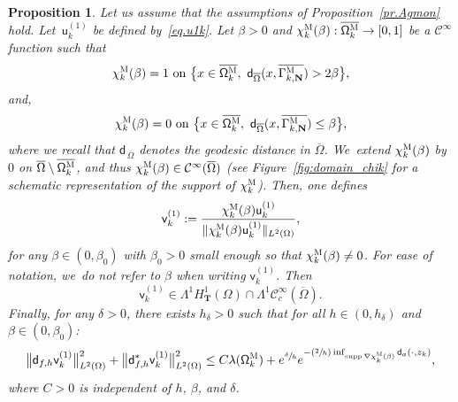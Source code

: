 \documentclass[JEP,XML,SOM,Unicode,NoEqCountersInSection,NoFloatCountersInSection,published]{cedram}
\newcommand{\Psfrac}[2]{(\sfrac{#1}{#2})}
\newcommand{\mbf}[1]{\mathbf{#1}}
\DeclareMathOperator\supp{supp}
\theoremstyle{plain}
\newtheorem{proposition}{Proposition}
\theoremstyle{definition}
\begin{document}
\begin{proposition}\label{pr.AgmonQM}
Let us assume that the assumptions of Proposition~\ref{pr.Agmon} hold.
Let~$\mathsf u^{(1)}_k$ be defined by~\eqref{eq.u1k}.
Let $\beta>0$ and $\chi_k^{\textsc{M}} (\beta): \overline{ \mathsf \Omega_k^{\textsc{M}}} \to [0,1]$ be a $\mathcal C^\infty$ function such that
\begin{equation}\label{eq.supp-close1}
\chi_k^{\textsc{M}} (\beta)=1 \text{ on } \big \{x\in \overline{ \mathsf \Omega_k^{\textsc{M}}}, \ \mathsf d_{\overline \Omega}(x, \overline{\Gamma_{k,\mbf N}^{\textsc{M}}})>2\beta\big \},
\end{equation}
and,
\begin{equation}\label{eq.supp-close2}
\chi_k^{\textsc{M}} (\beta)=0 \text{ on }\big \{x\in \overline{ \mathsf \Omega_k^{\textsc{M}}}, \ \mathsf d_{\overline \Omega}(x, \overline{\Gamma_{k,\mbf N}^{\textsc{M}}})\le \beta\big \},
\end{equation}
where we recall that $\mathsf d_{\, \overline \Omega}$ denotes the geodesic distance in $\overline \Omega$. We~extend $ \chi_k^{\textsc{M}} (\beta)$ by $0$ on $\overline{\Omega}\setminus \overline{ \mathsf \Omega_k^{\textsc{M}}}$, and thus $\chi_k^{\textsc{M}} (\beta)\in \mathcal C^\infty(\overline \Omega)$ (see Figure~\ref{fig:domain_chik} for a schematic representation of the support of $ \chi_k^{\textsc{M}}$).
Then, one defines
\begin{equation}\label{eq.QM1}
\mathsf v_k^{(1)}:=\frac{ \chi_k^{\textsc{M}} (\beta) \mathsf u_k^{(1)} }{\Vert \chi_k^{\textsc{M}} (\beta)\mathsf u_k^{(1)}\Vert _{ L^2 (\Omega) }},
\end{equation}
for any $\beta \in (0,\beta_0)$ with $\beta_0>0$ small enough so that
$\chi_k^{\textsc{M}} (\beta) \neq 0$.
For ease of notation, we~do not refer to $\beta$ when writing $\mathsf v_k^{(1)}$.
Then
\[
\mathsf v_k^{(1)}\in \Lambda^1H^1_{\mbf T}(\Omega) \cap \Lambda^1\mathcal C^\infty_c (\overline \Omega).
\]
Finally, for any $\delta>0$, there exists $h_\delta>0$ such that for
all $h\in (0,h_\delta)$ and $\beta \in (0,\beta_0)$:
\[
\big \| \mathsf d_{f,h} \mathsf v_k^{(1)} \big \|^{2}_{ L^{2} (\Omega)}+
\big \| \mathsf d^{*}_{f,h} \mathsf v_k^{(1)} \big \|^{2}_{ L^{2} (\Omega)}\le C\lambda(\mathsf \Omega_k^{\textsc{M}})+ e^{\sfrac \delta h} e^{-\Psfrac 2h \inf_{\supp \nabla \chi_k^{\textsc{M}} (\beta)} \mathsf d_a(\cdot,z_k)},
\]
where $C>0$ is independent of $h$, $\beta$, and $\delta$.
\end{proposition}
\end{document}
